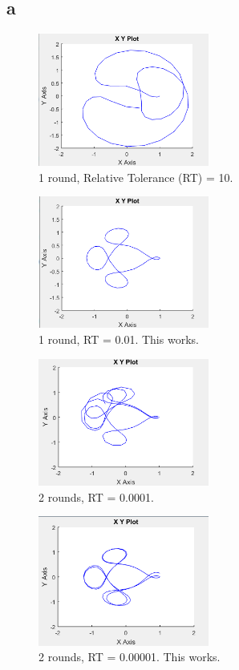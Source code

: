 \documentclass{article}
\begin{document}
\subsection{a}

\begin{figure}[!ht]
    \centering
    \includegraphics[width = 0.5\textwidth]{r1_rt_e1}
    \caption{1 round, Relative Tolerance (RT) = 10.}
\end{figure}

\begin{figure}[!ht]
    \centering
    \includegraphics[width = 0.5\textwidth]{r1_rt_e-2}
    \caption{1 round, RT = 0.01. This works.}
\end{figure}

\begin{figure}[!ht]
    \centering
    \includegraphics[width = 0.5\textwidth]{r2_rt_e-4}
    \caption{2 rounds, RT = 0.0001.}
\end{figure}

\begin{figure}[!ht]
    \centering
    \includegraphics[width = 0.5\textwidth]{r2_rt_e-5}
    \caption{2 rounds, RT = 0.00001. This works.}
\end{figure}
\end{document}
